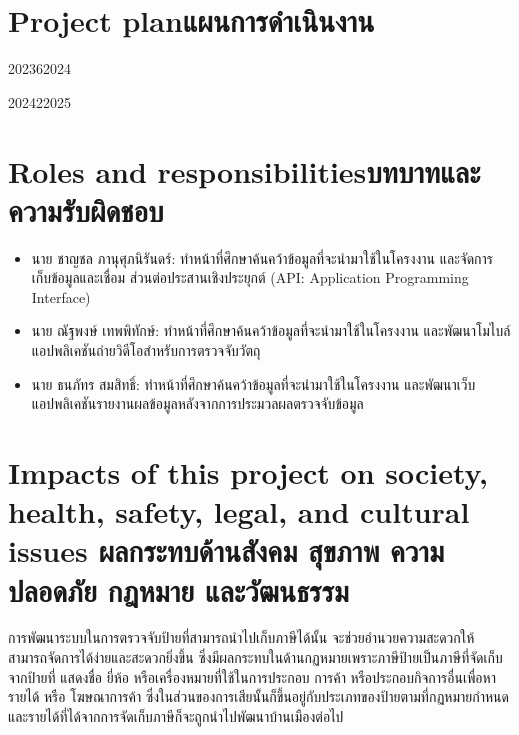 \section{\ifenglish Project plan\else แผนการดำเนินงาน\fi}

\begin{plan}{10}{2023}{6}{2024}
\end{plan}

\begin{plan}{7}{2024}{2}{2025}
\end{plan}

\section{\ifenglish Roles and responsibilities\else บทบาทและความรับผิดชอบ\fi}
\begin{itemize}
    \item นาย ชาญชล ภานุศุภนิรันดร์: ทำหน้าที่ศึกษาค้นคว้าข้อมูลที่จะนํามาใช้ในโครงงาน และจัดการเก็บข้อมูลและเชื่อม ส่วนต่อประสานเชิงประยุกต์ 
    (API: Application Programming Interface) 
    \item นาย ณัฐพงษ์ เทพพิทักษ์: ทําหน้าที่ศึกษาค้นคว้าข้อมูลที่จะนํามาใช้ในโครงงาน และพัฒนาโมไบล์แอปพลิเคชันถ่ายวิดีโอสำหรับการตรวจจับวัตถุ 
    \item นาย ธนภัทร สมสิทธิ์: ทําหน้าที่ศึกษาค้นคว้าข้อมูลที่จะนํามาใช้ในโครงงาน และพัฒนาเว็บแอปพลิเคชันรายงานผลข้อมูลหลังจากการประมวลผลตรวจจับข้อมูล 
\end{itemize}

\section{\ifenglish%
Impacts of this project on society, health, safety, legal, and cultural issues
\else%
ผลกระทบด้านสังคม สุขภาพ ความปลอดภัย กฎหมาย และวัฒนธรรม
\fi}

การพัฒนาระบบในการตรวจจับป้ายที่สามารถนำไปเก็บภาษีได้นั้น จะช่วยอำนวยความสะดวกให้สามารถจัดการได้ง่ายและสะดวกยิ่งขึ้น 
ซึ่งมีผลกระทบในด้านกฏหมายเพราะภาษีป้ายเป็นภาษีที่จัดเก็บจากป้ายที่ แสดงชื่อ ยี่ห้อ หรือเครื่องหมายที่ใช้ในการประกอบ การค้า หรือประกอบกิจการอื่นเพื่อหารายได้ หรือ 
โฆษณาการค้า ซึ่งในส่วนของการเสียนั้นก็ขึ้นอยู่กับประเภทของป้ายตามที่กฏหมายกำหนด และรายได้ที่ได้จากการจัดเก็บภาษีก็จะถูกนำไปพัฒนาบ้านเมืองต่อไป 
